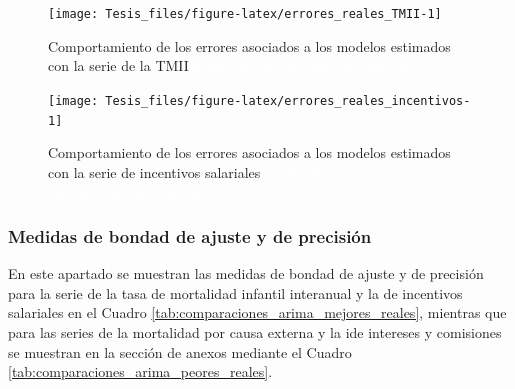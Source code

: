 \documentclass[
]{article}
\begin{document}
\begin{figure}[H]
\texttt{[image: Tesis\_files/figure-latex/errores\_reales\_TMII-1]} \caption{Comportamiento de los errores asociados a los modelos estimados con la serie de la TMII \textcolor{white}{prueba de aaaaaaaaaaaaaaaaaaaaaaa}}\label{fig:errores_reales_TMII}
\end{figure}

\begin{figure}[H]
\texttt{[image: Tesis\_files/figure-latex/errores\_reales\_incentivos-1]} \caption{Comportamiento de los errores asociados a los modelos estimados con la serie de incentivos salariales \textcolor{white}{prueba de aaaaaaaaaaaaaaaaaaaaaaa}}\label{fig:errores_reales_incentivos}
\end{figure}

\subsubsection{Medidas de bondad de ajuste y de precisión}

En este apartado se muestran las medidas de bondad de ajuste y de
precisión para la serie de la tasa de mortalidad infantil interanual y
la de incentivos salariales en el Cuadro
\ref{tab:comparaciones_arima_mejores_reales}, mientras que para las
series de la mortalidad por causa externa y la ide intereses y
comisiones se muestran en la sección de anexos mediante el Cuadro
\ref{tab:comparaciones_arima_peores_reales}.
\end{document}
